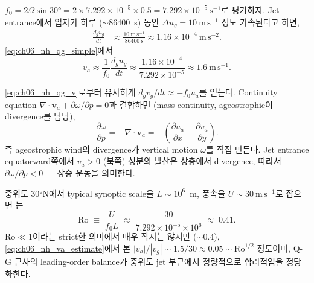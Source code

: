 \begin{example}[Magnitude of $v_a$ at 30°N]
$f_0 = 2\Omega\sin 30° = 2 \times 7.292\times 10^{-5} \times 0.5
= 7.292 \times 10^{-5}~\mathrm{s}^{-1}$로 평가하자.  Jet entrance에서 입자가
하루 ($\sim 86400$~s) 동안 $\Delta u_g = 10~\mathrm{m\,s^{-1}}$ 정도 가속된다고
하면,
\begin{align*}
  \frac{d_g u_g}{dt}
    &\approx \frac{10~\mathrm{m\,s^{-1}}}{86400~\mathrm{s}}
     \approx 1.16\times 10^{-4}~\mathrm{m\,s^{-2}}.
\end{align*}
\eqref{eq:ch06_nh_qg_simple}에서
\begin{equation}\label{eq:ch06_nh_va_estimate}
  v_a \approx \frac{1}{f_0}\frac{d_g u_g}{dt}
    \approx \frac{1.16\times 10^{-4}}{7.292\times 10^{-5}}
    \approx 1.6~\mathrm{m\,s^{-1}}.
\end{equation}
\end{example}


\begin{remark}
\eqref{eq:ch06_nh_qg_v}로부터 유사하게
$d_g v_g/dt \approx -f_0 u_a$를 얻는다.  Continuity equation
$\nabla\cdot\mathbf{v}_a + \partial\omega/\partial p = 0$과 결합하면 (mass
continuity, ageostrophic이 divergence를 담당),
\begin{equation}\label{eq:ch06_nh_omega_div}
  \frac{\partial \omega}{\partial p}
    = -\nabla\cdot\mathbf{v}_a
    = -\left(\frac{\partial u_a}{\partial x} + \frac{\partial v_a}{\partial y}\right).
\end{equation}
즉 ageostrophic wind의 divergence가 vertical motion $\omega$를 직접 만든다.
Jet entrance equatorward쪽에서 $v_a > 0$ (북쪽) 성분의 발산은 상층에서
divergence, 따라서 $\partial\omega/\partial p < 0$ — 상승 운동을 의미한다.
\end{remark}

\begin{example}
중위도 30°N에서 typical synoptic scale을 $L \sim 10^6$~m, 풍속을 $U \sim
30~\mathrm{m\,s^{-1}}$로 잡으면 는
\begin{equation}\label{eq:ch06_nh_rossby}
  \mathrm{Ro} \;\equiv\; \frac{U}{f_0 L}
  \;\approx\; \frac{30}{7.292\times 10^{-5} \times 10^6}
  \;\approx\; 0.41.
\end{equation}
$\mathrm{Ro} \ll 1$이라는 strict한 의미에서 매우 작지는 않지만 ($\sim 0.4$),
\eqref{eq:ch06_nh_va_estimate}에서 본 $|v_a|/|v_g| \sim 1.5/30 \approx 0.05
\sim \mathrm{Ro}^{1/2}$ 정도이며, Q-G 근사의 leading-order balance가
중위도 jet 부근에서 정량적으로 합리적임을 정당화한다.
\end{example}

